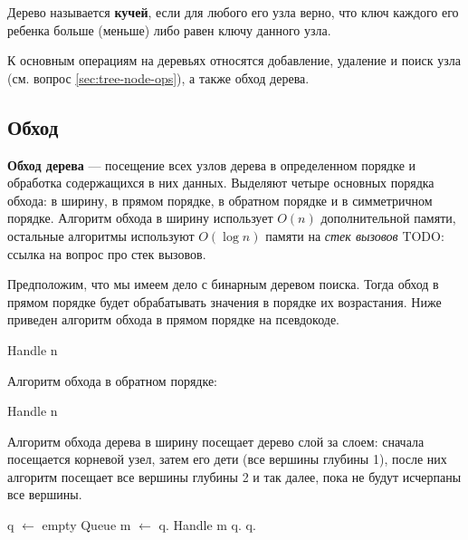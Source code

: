 Дерево называется \textbf{кучей}, если для любого его узла верно,
что ключ каждого его ребенка больше (меньше) либо равен ключу данного узла.

К основным операциям на деревьях относятся добавление, удаление и поиск узла (см. вопрос \ref{sec:tree-node-ops}), а также обход дерева.

\subsection{Обход}
\textbf{Обход дерева} --- посещение всех узлов дерева в определенном порядке и обработка содержащихся в них данных.
Выделяют четыре основных порядка обхода: в ширину, в прямом порядке, в обратном порядке и в симметричном порядке.
Алгоритм обхода в ширину использует $O(n)$ дополнительной памяти, остальные алгоритмы используют $O(\log n)$ памяти
на \textit{стек вызовов} {\color{red} TODO: ссылка на вопрос про стек вызовов}.

Предположим, что мы имеем дело с бинарным деревом поиска. Тогда обход в прямом порядке будет обрабатывать значения
в порядке их возрастания. Ниже приведен алгоритм обхода в прямом порядке на псевдокоде.
\begin{algorithmic}[1]
    \State Handle n
      \State {}
    \EndIf

      \State {}
    \EndIf
  \EndFunction
\end{algorithmic}

Алгоритм обхода в обратном порядке:
\begin{algorithmic}[1]
      \State {}
    \EndIf
      \State {}
    \EndIf
    \State Handle n
  \EndFunction
\end{algorithmic}


Алгоритм обхода дерева в ширину посещает дерево слой за слоем: сначала посещается корневой узел,
затем его дети (все вершины глубины 1), после них алгоритм посещает все вершины глубины 2 и так
далее, пока не будут исчерпаны все вершины.
\begin{algorithmic}[1]
    \State q $\gets$ empty Queue
    \State {}
      \State m $\gets$ q.
      \State Handle m
        \State q.
      \EndIf
        \State q.
      \EndIf
    \EndWhile
  \EndFunction
\end{algorithmic}

